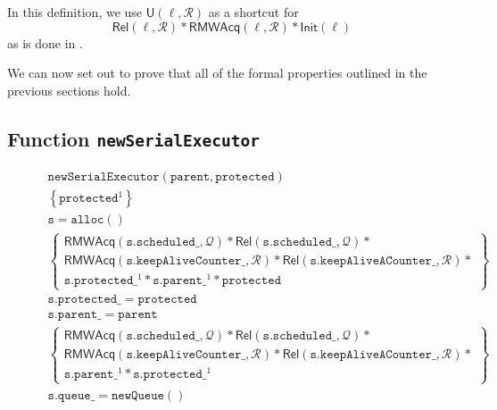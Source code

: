 In this definition, we use $\mathsf{U}(\ell, \mathcal{R})$ as a shortcut for 
$$\mathsf{Rel}(\ell, \mathcal{R}) * \mathsf{RMWAcq}(\ell, \mathcal{R}) * \mathsf{Init}(\ell)$$
as is done in \cite{fsl}.

We can now set out to prove that all of the formal properties outlined in the previous sections hold.

\subsection{Function \texttt{newSerialExecutor}}

\begin{figure}
\begin{equation*}
\begin{array}{l}
	\mathtt{newSerialExecutor(parent, protected)} \\
	
	\left\{\mathtt{protected}^1 \right\}\\

	\mathtt{s = alloc()}\\
			\left\{
			\begin{array}{l}
				\mathsf{RMWAcq}(\mathtt{s.scheduled\_}, \mathcal{Q}) * \mathsf{Rel}(\mathtt{s.scheduled\_}, \mathcal{Q}) * \\ 
					\mathsf{RMWAcq}(\mathtt{s.keepAliveCounter\_}, \mathcal{R}) * \mathsf{Rel}(\mathtt{s.keepAliveACounter\_}, \mathcal{R}) * \\
					\mathtt{s.protected\_}^1 * \mathtt{s.parent\_}^1 * \mathtt{protected}
			\end{array}
		\right\} \\

	\mathtt{s.protected\_ = protected} \\
	\mathtt{s.parent\_ = parent} \\

	\left\{
			\begin{array}{l}
				\mathsf{RMWAcq}(\mathtt{s.scheduled\_}, \mathcal{Q}) * \mathsf{Rel}(\mathtt{s.scheduled\_}, \mathcal{Q}) * \\ 
					\mathsf{RMWAcq}(\mathtt{s.keepAliveCounter\_}, \mathcal{R}) * \mathsf{Rel}(\mathtt{s.keepAliveACounter\_}, \mathcal{R}) * \\
					 \mathtt{s.parent\_}^1 * \mathtt{s.protected\_}^1
			\end{array} \right\} \\

			\mathtt{s.queue\_ = new Queue()} \\


\end{array}
\end{equation*}
\end{figure}
